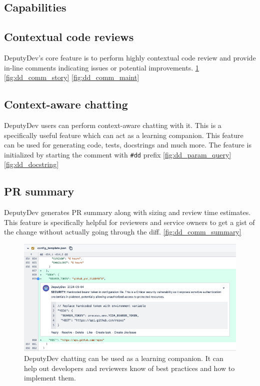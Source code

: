 \begin{appendices}
\section{Capabilities}
\label{app:capabilities}
\subsection{Contextual code reviews}
DeputyDev's core feature is to perform highly contextual code review and provide in-line comments indicating issues or potential improvements. \ref{fig:dd_comm_security} \ref{fig:dd_comm_story} \ref{fig:dd_comm_maint}

\subsection{Context-aware chatting}
DeputyDev users can perform context-aware chatting with it. This is a specifically useful feature which can act as a learning companion. This feature can be used for generating code, tests, docstrings and much more. The feature is initialized by starting the comment with \texttt{\#dd} prefix \ref{fig:dd_param_query} \ref{fig:dd_docstring}

\subsection{PR summary}
DeputyDev generates PR summary along with sizing and review time estimates. This feature is specifically helpful for reviewers and service owners to get a gist of the change without actually going through the diff. \ref{fig:dd_comm_summary}

\begin{figure}[htbp]
    \centering
    \includegraphics[scale=0.40]
    {Figures/dd_comm_security.png}
    \caption{DeputyDev chatting can be used as a learning companion. It can help out developers and reviewers know of best practices and how to implement them.}
    \label{fig:dd_comm_security}
\end{figure}


\end{appendices}
